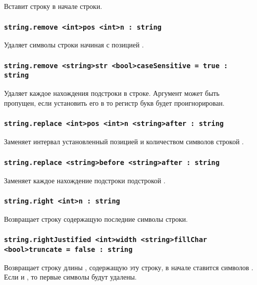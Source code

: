 \documentclass[a4paper, 14pt]{extarticle}
\begin{document}
Вставит строку  в начале строки.

\subsubsection{\lstinline|string.remove <int>pos <int>n : string|}

Удаляет  символы строки начиная с позицией .

\subsubsection{\lstinline|string.remove <string>str <bool>caseSensitive = true : string|}

Удаляет каждое нахождения подстроки  в строке. Аргумент  может быть пропущен, если установить его в \false{} то регистр букв будет проигнорирован.

\subsubsection{\lstinline|string.replace <int>pos <int>n <string>after : string|}

Заменяет интервал установленный позицией  и количеством символов  строкой .

\subsubsection{\lstinline|string.replace <string>before <string>after : string|}

Заменяет каждое нахождение подстроки  подстрокой .

\subsubsection{\lstinline|string.right <int>n : string|}

Возвращает строку содержащую последние  символы строки.

\subsubsection{\lstinline|string.rightJustified <int>width <string>fillChar <bool>truncate = false : string|}

Возвращает строку длины , содержащую эту строку, в начале ставится  символов . Если  и , то первые  символы будут удалены.
\end{document}

